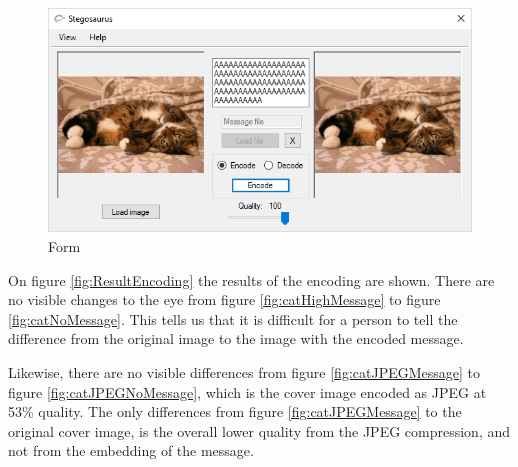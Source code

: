 \begin{figure}
    \centering
    \includegraphics[width=.7\textwidth]{figures/formShown.png}
    \caption{Form}
    \label{fig:formApp}
\end{figure}

On figure \ref{fig:ResultEncoding} the results of the encoding are shown.
There are no visible changes to the eye from figure \ref{fig:catHighMessage} to figure \ref{fig:catNoMessage}.
This tells us that it is difficult for a person to tell the difference from the original image to the image with the encoded message. 

Likewise, there are no visible differences from figure \ref{fig:catJPEGMessage} to figure \ref{fig:catJPEGNoMessage}, which is the cover image encoded as JPEG at 53\% quality.
The only differences from figure \ref{fig:catJPEGMessage} to the original cover image, is the overall lower quality from the JPEG compression, and not from the embedding of the message.

